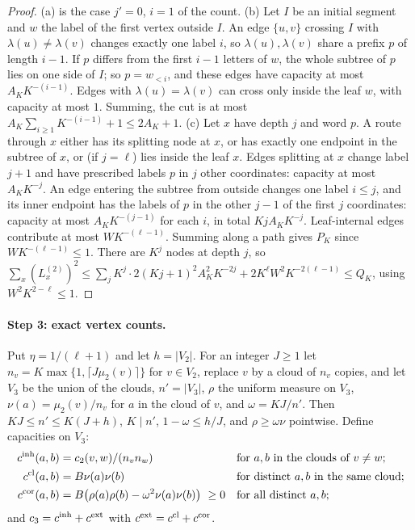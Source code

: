 \documentclass[11pt,letterpaper]{article}
\theoremstyle{definition}
\theoremstyle{remark}
\begin{document}
\begin{proof}
(a) is the case \(j'=0\), \(i=1\) of the count. (b) Let \(I\) be an initial
segment and \(w\) the label of the first vertex outside \(I\). An edge
\(\{u,v\}\) crossing \(I\) with \(\lambda(u)\ne\lambda(v)\) changes exactly
one label \(i\), so \(\lambda(u),\lambda(v)\) share a prefix \(p\) of length
\(i-1\). If \(p\) differs from the first \(i-1\) letters of \(w\), the whole
subtree of \(p\) lies on one side of \(I\); so \(p=w_{<i}\), and these edges
have capacity at most \(A_KK^{-(i-1)}\). Edges with
\(\lambda(u)=\lambda(v)\) can cross only inside the leaf \(w\), with capacity
at most \(1\). Summing, the cut is at most \(A_K\sum_{i\ge1}K^{-(i-1)}+1\le
2A_K+1\).
(c) Let \(x\) have depth \(j\) and word \(p\). A route through \(x\) either
has its splitting node at \(x\), or has exactly one endpoint in the subtree
of \(x\), or (if \(j=\ell\)) lies inside the leaf \(x\). Edges splitting at
\(x\) change label \(j+1\) and have prescribed labels \(p\) in \(j\) other
coordinates: capacity at most \(A_KK^{-j}\). An edge entering the subtree
from outside changes one label \(i\le j\), and its inner endpoint has the
labels of \(p\) in the other \(j-1\) of the first \(j\) coordinates:
capacity at most \(A_KK^{-(j-1)}\) for each \(i\), in total
\(KjA_KK^{-j}\). Leaf-internal edges contribute at most \(WK^{-(\ell-1)}\).
Summing along a path gives \(P_K\) since \(WK^{-(\ell-1)}\le1\). There are
\(K^j\) nodes at depth \(j\), so
\(\sum_x(L^{(2)}_x)^2\le\sum_jK^j\cdot2(Kj+1)^2A_K^2K^{-2j}+2K^\ell W^2
K^{-2(\ell-1)}\le Q_K\), using \(W^2K^{2-\ell}\le1\).
\end{proof}

\paragraph{Step 3: exact vertex counts.}
Put \(\eta=1/(\ell+1)\) and let \(h=|V_2|\). For an integer \(J\ge1\) let
\(n_v=K\max\{1,\lceil J\mu_2(v)\rceil\}\) for \(v\in V_2\), replace \(v\) by
a cloud of \(n_v\) copies, and let \(V_3\) be the union of the clouds,
\(n'=|V_3|\), \(\rho\) the uniform measure on \(V_3\), \(\nu(a)=\mu_2(v)/n_v\)
for \(a\) in the cloud of \(v\), and \(\omega=KJ/n'\). Then
\(KJ\le n'\le K(J+h)\), \(K\mid n'\), \(1-\omega\le h/J\), and
\(\rho\ge\omega\nu\) pointwise. Define capacities on \(V_3\):
\begin{align*}
c^{\rm inh}(a,b)&=c_2(v,w)/(n_vn_w)&&\text{for \(a,b\) in the clouds of \(v\ne w\)};\\
c^{\rm cl}(a,b)&=B\nu(a)\nu(b)&&\text{for distinct \(a,b\) in the same cloud};\\
c^{\rm cor}(a,b)&=B\bigl(\rho(a)\rho(b)-\omega^2\nu(a)\nu(b)\bigr)\ \ge0
&&\text{for all distinct \(a,b\)};
\end{align*}
and \(c_3=c^{\rm inh}+c^{\rm ext}\) with \(c^{\rm ext}=c^{\rm cl}+c^{\rm cor}\).
\end{document}
